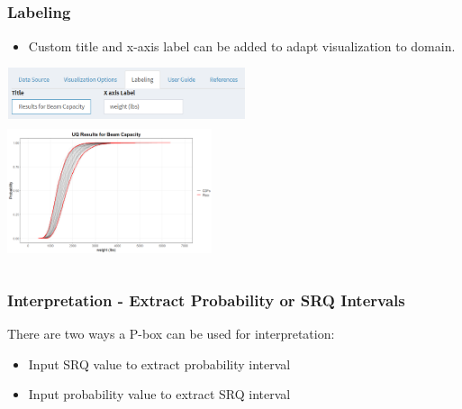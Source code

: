 \documentclass[handout, xcolor=dvipsnames]{beamer}
\begin{document}
\subsection{}
\begin{frame}
	\frametitle{Labeling}
	\begin{itemize}
	\item Custom title and x-axis label can be added to adapt visualization to domain. 
	\end{itemize}
	\begin{center} 
		\includegraphics[height=1.5cm,width=7cm]{figures/tab_lb.png} \\
		\includegraphics[height=4cm, width=6cm]{figures/plt_labeled.png}
	\end{center}
\end{frame}

\subsection{}
\begin{frame}
	\frametitle{Interpretation - Extract Probability or SRQ Intervals}
  There are two ways a P-box can be used for interpretation:
	\begin{itemize}
	  \item{Input SRQ value to extract probability interval}
	  \item{Input probability value to extract SRQ interval}
	\end{itemize}
\end{frame}
\end{document}
